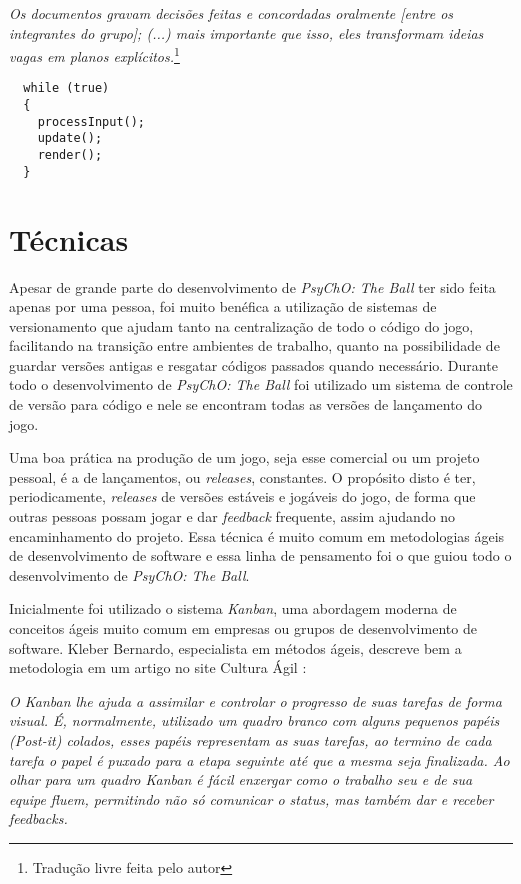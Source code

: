 \begin{displayquote}
  \textit{Os documentos gravam decisões feitas e concordadas oralmente [entre os integrantes do grupo]; (...) mais importante que isso, eles transformam ideias vagas em planos explícitos.}\footnote{Tradução livre feita pelo autor}
\end{displayquote}

\begin{lstlisting}
  while (true)
  {
    processInput();
    update();
    render();
  }
\end{lstlisting}

\section{Técnicas}
\label{sec:tecnicas}

Apesar de grande parte do desenvolvimento de \textit{PsyChO: The Ball} ter sido feita apenas por uma pessoa, foi muito benéfica a utilização de sistemas de versionamento que ajudam tanto na centralização de todo o código do jogo, facilitando na transição entre ambientes de trabalho, quanto na possibilidade de guardar versões antigas e resgatar códigos passados quando necessário. Durante todo o desenvolvimento de \textit{PsyChO: The Ball} foi utilizado um sistema de controle de versão para código e nele se encontram todas as versões de lançamento do jogo.

Uma boa prática na produção de um jogo, seja esse comercial ou um projeto pessoal, é a de lançamentos, ou \textit{releases}, constantes. O propósito disto é ter, periodicamente, \textit{releases} de versões estáveis e jogáveis do jogo, de forma que outras pessoas possam jogar e dar \textit{feedback} frequente, assim ajudando no encaminhamento do projeto. Essa técnica é muito comum em metodologias ágeis de desenvolvimento de software e essa linha de pensamento foi o que guiou todo o desenvolvimento de \textit{PsyChO: The Ball}.

Inicialmente foi utilizado o sistema \textit{Kanban}, uma abordagem moderna de conceitos ágeis muito comum em empresas ou grupos de desenvolvimento de software. Kleber Bernardo, especialista em métodos ágeis, descreve bem a metodologia em um artigo no site Cultura Ágil \cite{kleberkanban}:

\begin{displayquote}
  \textit{O Kanban lhe ajuda a assimilar e controlar o progresso de suas tarefas de forma visual. É, normalmente, utilizado um quadro branco com alguns pequenos papéis (Post-it) colados, esses papéis representam as suas tarefas, ao termino de cada tarefa o papel é puxado para a etapa seguinte até que a mesma seja finalizada. Ao olhar para um quadro Kanban é fácil enxergar como o trabalho seu e de sua equipe fluem, permitindo não só comunicar o status, mas também dar e receber feedbacks.}
\end{displayquote}

